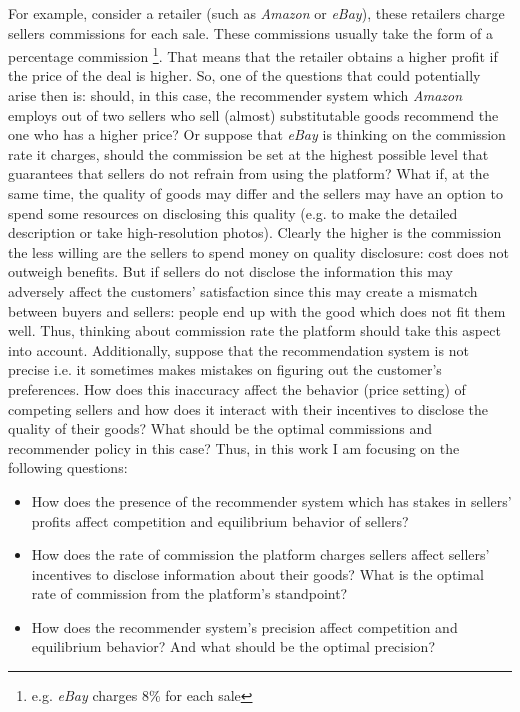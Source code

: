 \documentclass[a4paper]{article}
\begin{document}
For example, consider a retailer (such as \textit{Amazon} or \textit{eBay}), these retailers charge sellers commissions for each sale. These commissions usually take the form of a percentage commission \footnote{e.g. \textit{eBay} charges 8\% for each sale}. That means that the retailer obtains a higher profit if the price of the deal is higher. So, one of the questions that could potentially arise then is: should, in this case, the recommender system which \textit{Amazon} employs out of two sellers who sell (almost) substitutable goods recommend the one who has a higher price? Or suppose that \textit{eBay} is thinking on the commission rate it charges, %
 should the commission be set at the highest possible level that guarantees that sellers do not refrain from using the platform? What if, at the same time, the quality of goods may differ and the sellers may have an option to spend some resources on disclosing this quality (e.g. to make the detailed description or take high-resolution photos). Clearly the higher is the commission the less willing are the sellers to spend money on quality disclosure: cost does not outweigh benefits. But if sellers do not disclose the information this may adversely affect the customers' satisfaction since this may create a mismatch between buyers and sellers: people end up with the good which does not fit them well. Thus, thinking about commission rate the platform should take this aspect into account. Additionally, suppose that the recommendation system is not precise i.e. it sometimes makes mistakes on figuring out the customer's preferences. How does this inaccuracy affect the behavior (price setting) of competing sellers and how does it interact with their incentives to disclose the quality of their goods? What should be the optimal commissions and recommender policy in this case? Thus, in this work I am focusing on the following questions:
 \begin{itemize}
 	\item How does the presence of the recommender system which has stakes in sellers' profits affect competition and equilibrium behavior of sellers?
 	\item How does the rate of commission the platform charges sellers affect sellers' incentives to disclose information about their goods? What is the optimal rate of commission from the platform's standpoint?
 	\item How does the recommender system's precision affect competition and equilibrium behavior? And what should be the optimal precision?
 \end{itemize}
 
\end{document}
